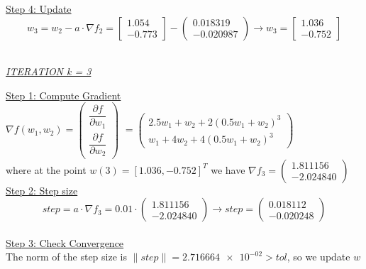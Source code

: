 \underline{Step 4: Update}
\[ 
w_3 = w_2 - a\cdot \nabla f_2 =  \left[\begin{array}{c}
	1.054 \\
	-0.773
\end{array}\right] - \left(\begin{array}{c}
	0.018319 \\
-0.020987
\end{array}\right) \rightarrow
w_3 = \left[\begin{array}{c}
	1.036\\
	-0.752
\end{array}\right]
\]
\\[4mm]

\begin{center}
	\underline{\textit{ITERATION k = 3}}
\end{center}

\underline{Step 1: Compute Gradient}\\
\(\nabla f(w_1,w_2) = \left(\begin{array}{c}
	\dfrac{\partial f}{\partial w_1} \\[4mm]
	\dfrac{\partial f}{\partial w_2}
\end{array}\right)\) $= \left(\begin{array}{c}
	2.5w_1 + w_2 + 2(0.5w_1+w_2)^3\\[1mm]
	w_1 + 4w_2 + 4(0.5w_1+w_2)^3
\end{array}\right)$ \\[3mm]

where at the point $w\left(3\right) = \left[1.036, -0.752\right]^T$ we have $\nabla f_{3} = \left(\begin{array}{c}
	1.811156 \\
	-2.024840
\end{array}\right)$
\\[4mm]

\underline{Step 2: Step size}
\[
step = a \cdot \nabla f_{3} = 0.01 \cdot \left(\begin{array}{c}
	1.811156 \\
-2.024840
\end{array}\right) \rightarrow step =\left(\begin{array}{c}
	0.018112 \\
	-0.020248
\end{array}\right)
\]
\\[4mm]

\underline{Step 3: Check Convergence}\\
The norm of the step size is $\| step \| = \num{2.716664e-02} > tol$, so we update $w$
\\[4mm]

